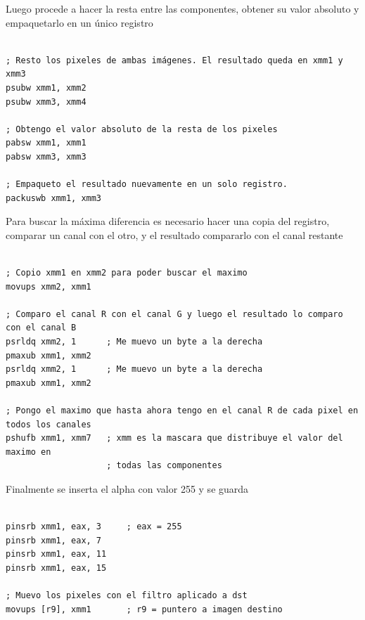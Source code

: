 \documentclass[10pt,a4paper,spanish]{article}
\begin{document}
Luego procede a hacer la resta entre las componentes, obtener su valor absoluto y empaquetarlo en un único registro

\begin{codesnippet}
\begin{verbatim}

; Resto los pixeles de ambas imágenes. El resultado queda en xmm1 y xmm3
psubw xmm1, xmm2
psubw xmm3, xmm4

; Obtengo el valor absoluto de la resta de los pixeles
pabsw xmm1, xmm1
pabsw xmm3, xmm3

; Empaqueto el resultado nuevamente en un solo registro.
packuswb xmm1, xmm3

\end{verbatim}
\end{codesnippet}

Para buscar la máxima diferencia es necesario hacer una copia del registro, comparar un canal con el otro, y el resultado compararlo con el canal restante

\begin{codesnippet}
\begin{verbatim}

; Copio xmm1 en xmm2 para poder buscar el maximo
movups xmm2, xmm1

; Comparo el canal R con el canal G y luego el resultado lo comparo con el canal B
psrldq xmm2, 1		; Me muevo un byte a la derecha
pmaxub xmm1, xmm2
psrldq xmm2, 1		; Me muevo un byte a la derecha
pmaxub xmm1, xmm2

; Pongo el maximo que hasta ahora tengo en el canal R de cada pixel en todos los canales
pshufb xmm1, xmm7   ; xmm es la mascara que distribuye el valor del maximo en
                    ; todas las componentes

\end{verbatim}
\end{codesnippet}

Finalmente se inserta el alpha con valor 255 y se guarda

\begin{codesnippet}
\begin{verbatim}

pinsrb xmm1, eax, 3     ; eax = 255
pinsrb xmm1, eax, 7
pinsrb xmm1, eax, 11
pinsrb xmm1, eax, 15

; Muevo los pixeles con el filtro aplicado a dst
movups [r9], xmm1       ; r9 = puntero a imagen destino

\end{verbatim}
\end{codesnippet}
\end{document}
